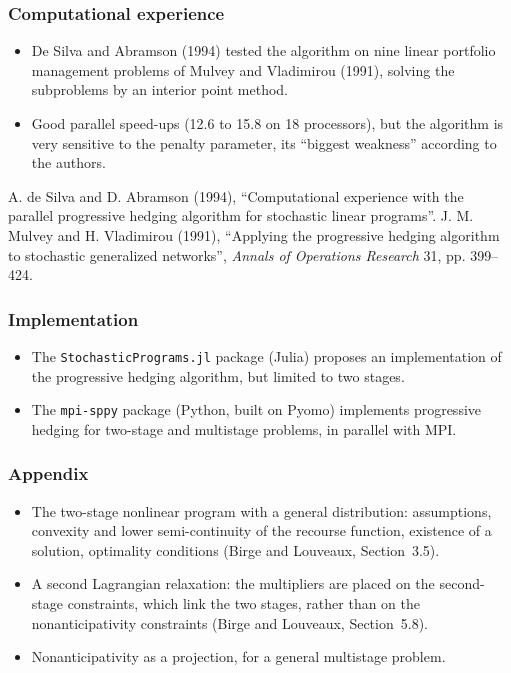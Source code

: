 \documentclass[aspectratio=169]{beamer}
\begin{document}
\begin{frame}
\frametitle{Computational experience}

\begin{itemize}
\item
De Silva and Abramson (1994) tested the algorithm on nine linear portfolio management problems of Mulvey and Vladimirou (1991), solving the subproblems by an interior point method.
\item
Good parallel speed-ups (12.6 to 15.8 on 18 processors), but the algorithm is very sensitive to the penalty parameter, its ``biggest weakness'' according to the authors.
\end{itemize}

{\footnotesize
A. de Silva and D. Abramson (1994), ``Computational experience with the parallel progressive hedging algorithm for stochastic linear programs''.
J. M. Mulvey and H. Vladimirou (1991), ``Applying the progressive hedging algorithm to stochastic generalized networks'', {\sl Annals of Operations Research} 31, pp. 399--424.
}

\end{frame}

\begin{frame}[fragile]
\frametitle{Implementation}

\begin{itemize}
\item
The \verb|StochasticPrograms.jl| package (Julia) proposes an implementation of the progressive hedging algorithm, but limited to two stages.
\item
The \verb|mpi-sppy| package (Python, built on Pyomo) implements progressive hedging for two-stage and multistage problems, in parallel with MPI.
\end{itemize}

\end{frame}

\appendix

\begin{frame}
\frametitle{Appendix}

\begin{itemize}
\item
The two-stage nonlinear program with a general distribution: assumptions, convexity and lower semi-continuity of the recourse function, existence of a solution, optimality conditions (Birge and Louveaux, Section~3.5).
\item
A second Lagrangian relaxation: the multipliers are placed on the second-stage constraints, which link the two stages, rather than on the nonanticipativity constraints (Birge and Louveaux, Section~5.8).
\item
Nonanticipativity as a projection, for a general multistage problem.
\end{itemize}

\end{frame}
\end{document}
